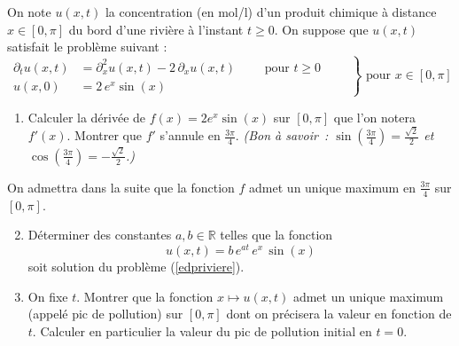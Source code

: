 \begin{exo}
    On note $u(x,t)$ la concentration (en {mol/l}) d'un produit chimique à distance $x \in [0,\pi]$ du bord d'une rivière à l'instant $t \geq 0$. On suppose que $u(x,t)$ satisfait le problème suivant :
    \begin{equation}
        \left.
        \begin{aligned}
            \partial_{t}u(x,t) &= \partial_{x}^{2}u(x,t) -2\,\partial_{x}u(x,t) \qquad \text{ pour } t \geq 0 \qquad \\
            u(x,0)             &= 2\,e^{x}\sin(x)
        \end{aligned}
        \right\}
        \text{ pour } x \in [0,\pi] \label{edpriviere}
    \end{equation}
    \begin{enumerate}
        \item Calculer la dérivée de $f(x)=2e^{x}\sin(x)$ sur $[0,\pi]$ que l'on notera $f'(x)$. Montrer que $f'$ s'annule en $\frac{3\pi}{4}$.
        \textit{(Bon à savoir~: $\sin(\frac{3\pi}{4})=\frac{\sqrt{2}}{2}$ et $\cos(\frac{3\pi}{4})=-\frac{\sqrt{2}}{2}$.)}
    \end{enumerate}

        \noindent On admettra dans la suite que la fonction $f$ admet un unique maximum en $\frac{3\pi}{4}$ sur $[0,\pi]$.

    \begin{enumerate}\setcounter{enumi}{1}
        \item Déterminer des constantes $a,b \in \mathbb{R}$ telles que la fonction
        \begin{equation*}
            u(x,t) = b\,e^{at}\,e^{x}\,\sin(x)
        \end{equation*}
        soit solution du problème (\ref{edpriviere}).

        \item On fixe $t$. Montrer que la fonction $x \mapsto u(x,t)$ admet un unique maximum (appelé pic de pollution) sur $[0,\pi]$ dont on précisera la valeur en fonction de $t$. Calculer en particulier la valeur du pic de pollution initial en $t=0$.
    \end{enumerate}
\end{exo}

